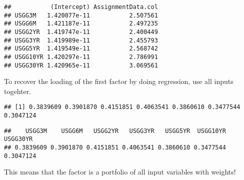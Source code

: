 \documentclass[]{article}
\newenvironment{Shaded}{\begin{snugshade}}{\end{snugshade}}
\newcommand{\KeywordTok}[1]{\textcolor[rgb]{0.13,0.29,0.53}{\textbf{#1}}}
\newcommand{\DecValTok}[1]{\textcolor[rgb]{0.00,0.00,0.81}{#1}}
\newcommand{\ControlFlowTok}[1]{\textcolor[rgb]{0.13,0.29,0.53}{\textbf{#1}}}
\newcommand{\OperatorTok}[1]{\textcolor[rgb]{0.81,0.36,0.00}{\textbf{#1}}}
\newcommand{\NormalTok}[1]{#1}
\begin{document}
\begin{Shaded}
\end{Shaded}

\begin{verbatim}
##           (Intercept) AssignmentData.col
## USGG3M   1.420077e-11           2.507561
## USGG6M   1.421187e-11           2.497235
## USGG2YR  1.419747e-11           2.400449
## USGG3YR  1.419989e-11           2.455793
## USGG5YR  1.419549e-11           2.568742
## USGG10YR 1.420297e-11           2.786991
## USGG30YR 1.420965e-11           3.069561
\end{verbatim}

To recover the loading of the first factor by doing regression, use all
inputs togehter.

\begin{Shaded}
\end{Shaded}

\begin{verbatim}
## [1] 0.3839609 0.3901870 0.4151851 0.4063541 0.3860610 0.3477544 0.3047124
\end{verbatim}

\begin{Shaded}
\end{Shaded}

\begin{verbatim}
##    USGG3M    USGG6M   USGG2YR   USGG3YR   USGG5YR  USGG10YR  USGG30YR 
## 0.3839609 0.3901870 0.4151851 0.4063541 0.3860610 0.3477544 0.3047124
\end{verbatim}

This means that the factor is a portfolio of all input variables with
weights!
\end{document}
